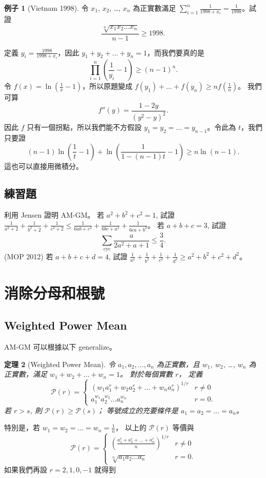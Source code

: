 \documentclass[11pt,nothm]{scrartcl}
\newtheorem{theorem}{\color{blue!40!black}定理}
\theoremstyle{definition}
\newtheorem{example}[theorem]{\color{blue!40!black}例子}
\let\oldendproof\endproof
\renewenvironment{proof}[1][【證】]{%
  \oldproof[\bfseries #1\nopunct]%
}{\oldendproof}
\begin{document}
\begin{example}
  [Vietnam 1998] 令 $x_1$, $x_2$, \dots, $x_n$ 為正實數滿足 $\sum_{i=1}^n \frac{1}{1998+x_i} = \frac{1}{1998}$。試證
  \[ \frac{\sqrt[n]{x_1x_2 \dots x_n}}{n-1} \ge 1998. \]
\end{example}
\begin{proof}
  定義 $y_i = \frac{1998}{1998+x_i}$，因此 $y_1 + y_2 + \dots + y_n = 1$，而我們要真的是
  \[ \prod_{i=1}^n \left( \frac{1}{y_i} - 1 \right) \ge \left( n-1 \right)^n. \]
  令 $f(x) = \ln \left( \frac 1x-1 \right)$，所以原題變成 $f(y_1) + \dots + f(y_n) \ge n f\left( \frac 1n \right)$。
  我們可算
  \[ f''(y) = \frac{1-2y}{(y^2-y)^2}. \]
  因此 $f$ 只有一個拐點，所以我們能不方假設 $y_1 = y_2 = \dots = y_{n-1}$。令此為 $t$，我們只要證
  \[ (n-1) \ln \left( \frac{1}{t}-1 \right) + \ln \left( \frac{1}{1-(n-1)t}-1 \right) \ge n \ln (n-1). \]
  這也可以直接用微積分。
\end{proof}

\subsection{練習題}
\begin{enumerate}
  \ii 利用 Jensen 證明 AM-GM。
  \ii 若 $a^2+b^2+c^2=1$, 試證 $\frac{1}{a^2+2}+\frac{1}{b^2+2}+\frac{1}{c^2+2}\le\frac{1}{6ab+c^2}+\frac{1}{6bc+a^2}+\frac{1}{6ca+b^2}$。
  \ii 若 $a+b+c=3$, 試證 \[ \sum_{\text{cyc}} \frac{a}{2a^2+a+1} \le \frac 34. \]
  \ii (MOP 2012) 若 $a+b+c+d = 4$, 試證 $\frac{1}{a^2}+\frac{1}{b^2}+\frac{1}{c^2}+\frac{1}{d^2}\ge a^2+b^2+c^2+d^2$。
\end{enumerate}

\section{消除分母和根號}
\subsection{Weighted Power Mean}
AM-GM 可以根據以下 generalize。
\begin{theorem}
  [Weighted Power Mean] 令 $a_1, a_2, \dots, a_n$ 為正實數，且 $w_1$, $w_2$, \dots, $w_n$ 為正實數，滿足 $w_1+w_2+\dots+w_n=1$。
  對於每個實數 $r$， 定義
  \[ \mathcal P(r) =
    \begin{cases}
      \left( w_1 a_1^r + w_2 a_2^r + \dots + w_n a_n^r \right)^{1/r} & r \neq 0 \\[1em]
      a_1^{w_1} a_2^{w_2} \dots a_n^{w_n} & r = 0.
    \end{cases}
  \]
  若 $r>s$, 則 $\mathcal P(r) \ge \mathcal P(s)$； 等號成立的充要條件是 $a_1 = a_2 = \dots = a_n$。
\end{theorem}
特別是，若 $w_1 = w_2 = \dots = w_n = \frac 1n$， 以上的 $\mathcal P(r)$ 等價與
  \[ \mathcal P(r) =
    \begin{cases}
      \left( \displaystyle\frac{a_1^r + a_2^r + \dots + a_n^r}{n} \right)^{1/r} & r \neq 0 \\[1.5em]
      \sqrt[n]{a_1a_2 \dots a_n} & r = 0.
    \end{cases}
  \]
如果我們再設 $r = 2,1,0,-1$ 就得到
\end{document}
